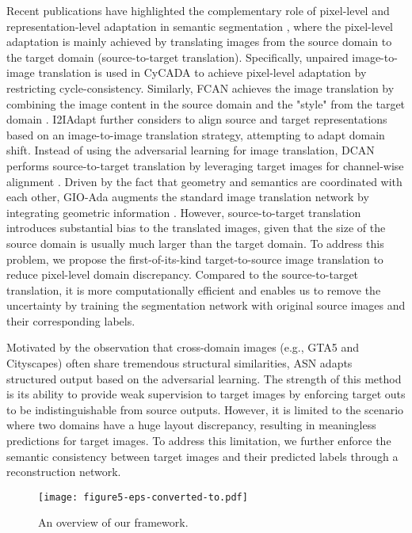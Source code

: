 \documentclass[runningheads]{llncs}
\begin{document}
	Recent publications have highlighted the complementary role of pixel-level and representation-level adaptation in semantic segmentation \cite{hoffman2017cycada,murez2017image,zhang2018fully,wu2018dcan,chen2019learning}, where the pixel-level adaptation is mainly achieved by translating images from the source domain to the target domain (source-to-target translation). Specifically, unpaired image-to-image translation is used in CyCADA \cite{hoffman2017cycada} to achieve pixel-level adaptation by restricting cycle-consistency. Similarly, FCAN achieves the image translation by combining the image content in the source domain and the "style" from the target domain \cite{zhang2018fully}. I2IAdapt \cite{murez2017image} further considers to align source and target representations based on an image-to-image translation strategy, attempting to adapt domain shift. Instead of using the adversarial learning for image translation, DCAN performs source-to-target translation by leveraging target images for channel-wise alignment \cite{wu2018dcan}. Driven by the fact that geometry and semantics are coordinated with each other, GIO-Ada augments the standard image translation network by integrating geometric information \cite{chen2019learning}. However, source-to-target translation introduces substantial bias to the translated images, given that the size of the source domain is usually much larger than the target domain. To address this problem, we propose the first-of-its-kind target-to-source image translation to reduce pixel-level domain discrepancy. Compared to the source-to-target translation, it is more computationally efficient and enables us to remove the uncertainty by training the segmentation network with original source images and their corresponding labels.
	


	Motivated by the observation that cross-domain images (e.g., GTA5 and Cityscapes) often share tremendous structural similarities, ASN \cite{tsai2018learning} adapts structured output based on the adversarial learning. The strength of this method is its ability to provide weak supervision to target images by enforcing target outs to be indistinguishable from source outputs. However, it is limited to the scenario where two domains have a huge layout discrepancy, resulting in meaningless predictions for target images. To address this limitation, we further enforce the semantic consistency between target images and their predicted labels through a reconstruction network.
	
	\setlength\intextsep{0pt}
    \begin{wrapfigure}{r}{0.55\textwidth}
		\begin{center}
			\texttt{[image: figure5-eps-converted-to.pdf]}
		\end{center}
		\caption{An overview of our framework.}
		\label{fig:overview}
\end{wrapfigure}
	
\end{document}
